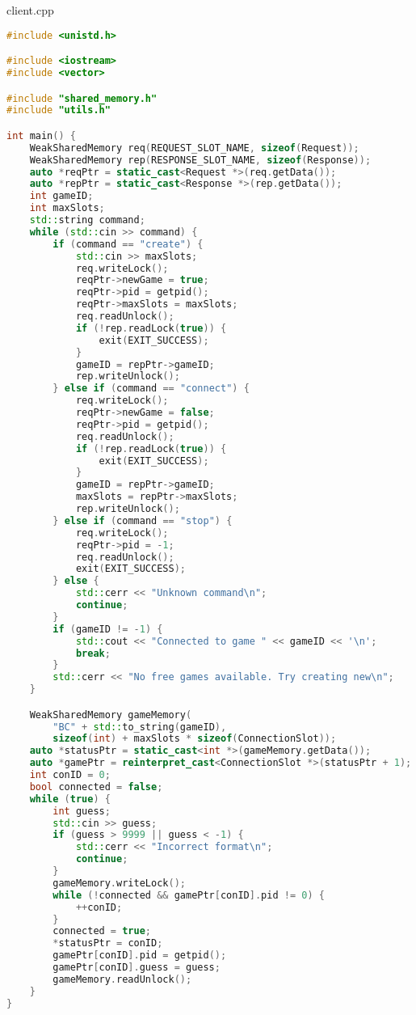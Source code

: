 \documentclass[a4paper, 12pt]{article}
\begin{document}
client.cpp
\begin{lstlisting}[language=C++]
#include <unistd.h>

#include <iostream>
#include <vector>

#include "shared_memory.h"
#include "utils.h"

int main() {
    WeakSharedMemory req(REQUEST_SLOT_NAME, sizeof(Request));
    WeakSharedMemory rep(RESPONSE_SLOT_NAME, sizeof(Response));
    auto *reqPtr = static_cast<Request *>(req.getData());
    auto *repPtr = static_cast<Response *>(rep.getData());
    int gameID;
    int maxSlots;
    std::string command;
    while (std::cin >> command) {
        if (command == "create") {
            std::cin >> maxSlots;
            req.writeLock();
            reqPtr->newGame = true;
            reqPtr->pid = getpid();
            reqPtr->maxSlots = maxSlots;
            req.readUnlock();
            if (!rep.readLock(true)) {
                exit(EXIT_SUCCESS);
            }
            gameID = repPtr->gameID;
            rep.writeUnlock();
        } else if (command == "connect") {
            req.writeLock();
            reqPtr->newGame = false;
            reqPtr->pid = getpid();
            req.readUnlock();
            if (!rep.readLock(true)) {
                exit(EXIT_SUCCESS);
            }
            gameID = repPtr->gameID;
            maxSlots = repPtr->maxSlots;
            rep.writeUnlock();
        } else if (command == "stop") {
            req.writeLock();
            reqPtr->pid = -1;
            req.readUnlock();
            exit(EXIT_SUCCESS);
        } else {
            std::cerr << "Unknown command\n";
            continue;
        }
        if (gameID != -1) {
            std::cout << "Connected to game " << gameID << '\n';
            break;
        }
        std::cerr << "No free games available. Try creating new\n";
    }

    WeakSharedMemory gameMemory(
        "BC" + std::to_string(gameID),
        sizeof(int) + maxSlots * sizeof(ConnectionSlot));
    auto *statusPtr = static_cast<int *>(gameMemory.getData());
    auto *gamePtr = reinterpret_cast<ConnectionSlot *>(statusPtr + 1);
    int conID = 0;
    bool connected = false;
    while (true) {
        int guess;
        std::cin >> guess;
        if (guess > 9999 || guess < -1) {
            std::cerr << "Incorrect format\n";
            continue;
        }
        gameMemory.writeLock();
        while (!connected && gamePtr[conID].pid != 0) {
            ++conID;
        }
        connected = true;
        *statusPtr = conID;
        gamePtr[conID].pid = getpid();
        gamePtr[conID].guess = guess;
        gameMemory.readUnlock();
    }
}
\end{lstlisting}
\end{document}
